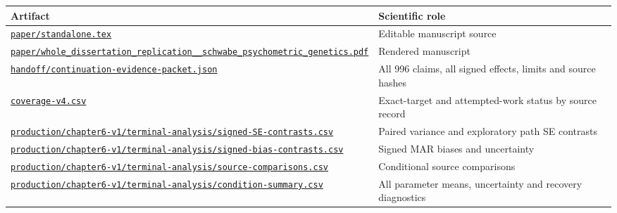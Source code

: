 \documentclass[11pt]{article}
\begin{document}
\begin{longtable}{p{225pt}p{220pt}}
\toprule Artifact & Scientific role\\\midrule\endhead
\href{https://github.com/alectionary/vibe-math/blob/master/formalization/schwabe-psychometric-genetics/paper/standalone.tex}{\nolinkurl{paper/standalone.tex}} & Editable manuscript source\\
\href{https://github.com/alectionary/vibe-math/blob/master/formalization/schwabe-psychometric-genetics/paper/whole_dissertation_replication__schwabe_psychometric_genetics.pdf}{\nolinkurl{paper/whole_dissertation_replication__schwabe_psychometric_genetics.pdf}} & Rendered manuscript\\
\href{https://github.com/alectionary/vibe-math/blob/master/formalization/schwabe-psychometric-genetics/handoff/continuation-evidence-packet.json}{\nolinkurl{handoff/continuation-evidence-packet.json}} & All 996 claims, all signed effects, limits and source hashes\\
\href{https://github.com/alectionary/vibe-math/blob/master/formalization/schwabe-psychometric-genetics/coverage-v4.csv}{\nolinkurl{coverage-v4.csv}} & Exact-target and attempted-work status by source record\\
\href{https://github.com/alectionary/vibe-math/blob/master/formalization/schwabe-psychometric-genetics/production/chapter6-v1/terminal-analysis/signed-SE-contrasts.csv}{\nolinkurl{production/chapter6-v1/terminal-analysis/signed-SE-contrasts.csv}} & Paired variance and exploratory path SE contrasts\\
\href{https://github.com/alectionary/vibe-math/blob/master/formalization/schwabe-psychometric-genetics/production/chapter6-v1/terminal-analysis/signed-bias-contrasts.csv}{\nolinkurl{production/chapter6-v1/terminal-analysis/signed-bias-contrasts.csv}} & Signed MAR biases and uncertainty\\
\href{https://github.com/alectionary/vibe-math/blob/master/formalization/schwabe-psychometric-genetics/production/chapter6-v1/terminal-analysis/source-comparisons.csv}{\nolinkurl{production/chapter6-v1/terminal-analysis/source-comparisons.csv}} & Conditional source comparisons\\
\href{https://github.com/alectionary/vibe-math/blob/master/formalization/schwabe-psychometric-genetics/production/chapter6-v1/terminal-analysis/condition-summary.csv}{\nolinkurl{production/chapter6-v1/terminal-analysis/condition-summary.csv}} & All parameter means, uncertainty and recovery diagnostics\\

\end{longtable}
\end{document}
